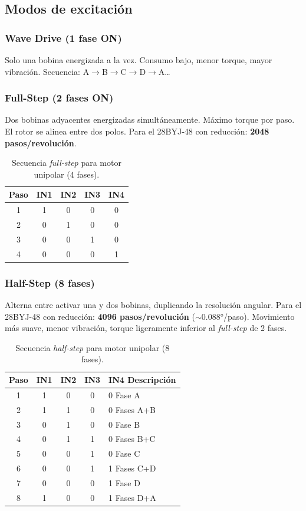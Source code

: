 \documentclass[11pt]{article}
\begin{document}
\subsection{Modos de excitación}
\subsubsection{Wave Drive (1 fase ON)}
Solo una bobina energizada a la vez. Consumo bajo, menor torque, mayor vibración.
Secuencia: A$\to$B$\to$C$\to$D$\to$A\ldots

\subsubsection{Full-Step (2 fases ON)}
Dos bobinas adyacentes energizadas simultáneamente. Máximo torque por paso. El rotor se
alinea entre dos polos. Para el 28BYJ-48 con reducción: \textbf{2048 pasos/revolución}.
\begin{table}[H]\centering
\caption{Secuencia \emph{full-step} para motor unipolar (4 fases).}
\begin{tabular}{ccccc}
\toprule
Paso & IN1 & IN2 & IN3 & IN4 \\
\midrule
1 & 1 & 0 & 0 & 0 \\
2 & 0 & 1 & 0 & 0 \\
3 & 0 & 0 & 1 & 0 \\
4 & 0 & 0 & 0 & 1 \\
\bottomrule
\end{tabular}
\end{table}

\subsubsection{Half-Step (8 fases)}
Alterna entre activar una y dos bobinas, duplicando la resolución angular. Para el
28BYJ-48 con reducción: \textbf{4096 pasos/revolución} ($\sim 0.088\si{\degree}$/paso).
Movimiento más suave, menor vibración, torque ligeramente inferior al \emph{full-step} de
2 fases.
\begin{table}[H]\centering
\caption{Secuencia \emph{half-step} para motor unipolar (8 fases).}
\begin{tabular}{ccccl}
\toprule
Paso & IN1 & IN2 & IN3 & IN4 \quad Descripción \\
\midrule
1 & 1 & 0 & 0 & 0 \quad Fase A \\
2 & 1 & 1 & 0 & 0 \quad Fases A+B \\
3 & 0 & 1 & 0 & 0 \quad Fase B \\
4 & 0 & 1 & 1 & 0 \quad Fases B+C \\
5 & 0 & 0 & 1 & 0 \quad Fase C \\
6 & 0 & 0 & 1 & 1 \quad Fases C+D \\
7 & 0 & 0 & 0 & 1 \quad Fase D \\
8 & 1 & 0 & 0 & 1 \quad Fases D+A \\
\bottomrule
\end{tabular}
\end{table}
\end{document}
